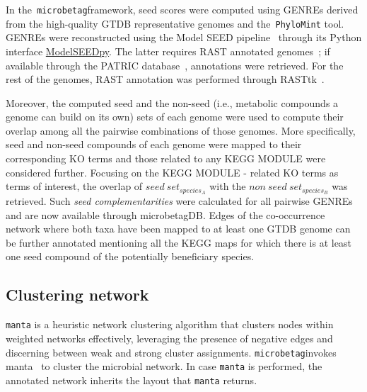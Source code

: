 \documentclass[sn-mathphys,Numbered]{sn-jnl}  %
\theoremstyle{thmstyleone}%
\theoremstyle{thmstyletwo}%
\theoremstyle{thmstylethree}%
\newcommand{\microbetag}{\texttt{microbetag}}
\begin{document}
        In the~\microbetag framework, seed scores were computed using GENREs derived from the high-quality GTDB representative genomes and the~\texttt{PhyloMint} tool.
        GENREs were reconstructed using the Model SEED pipeline~\cite{henry2010high} through its Python interface \href{https://modelseedpy.readthedocs.io/en/latest/index.html}{ModelSEEDpy}.
        The latter requires RAST annotated genomes~\cite{overbeek2014seed}; 
        if available through the PATRIC database~\cite{wattam2017improvements}, annotations were retrieved.
        For the rest of the genomes, RAST annotation was performed through RASTtk~\cite{brettin2015rasttk}.

        Moreover, the computed seed and the non-seed (i.e., metabolic compounds a genome can build on its own) sets of each genome were used to compute their overlap among all the pairwise combinations of those genomes.
        More specifically, seed and non-seed compounds of each genome were mapped to their corresponding KO terms and those related to any KEGG MODULE were considered further.
        Focusing on the KEGG MODULE - related KO terms as terms of interest, the overlap of ${seed\ set}_{species_A}$ with the ${non\ seed\ set}_{species_B}$ was retrieved.
        Such \textit{seed complementarities} were calculated for all pairwise GENREs and are now available through microbetagDB.
        Edges of the co-occurrence network where both taxa have been mapped to at least one GTDB genome can be further annotated mentioning all the KEGG maps for which there is at least one seed compound of the potentially beneficiary species. 



    \subsection*{Clustering network}
    \label{subsec:manta}

        \texttt{manta} is a heuristic network clustering algorithm that clusters nodes within weighted networks effectively, leveraging the presence of negative edges and discerning between weak and strong cluster assignments.
        \microbetag invokes manta~\cite{rottjers2020manta} to cluster the microbial network.
        In case \texttt{manta} is performed, the annotated network inherits the layout that \texttt{manta} returns.
\end{document}
